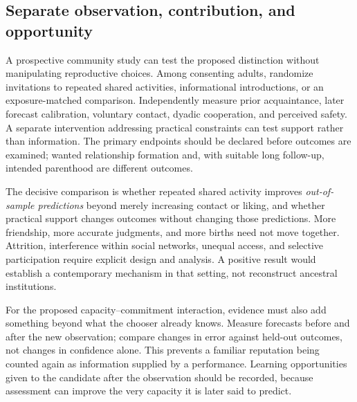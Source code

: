 \documentclass[10pt,twocolumn,letterpaper]{article}
\begin{document}
\subsection{Separate observation, contribution, and opportunity}
A prospective community study can test the proposed distinction without manipulating reproductive choices. Among consenting adults, randomize invitations to repeated shared activities, informational introductions, or an exposure-matched comparison. Independently measure prior acquaintance, later forecast calibration, voluntary contact, dyadic cooperation, and perceived safety. A separate intervention addressing practical constraints can test support rather than information. The primary endpoints should be declared before outcomes are examined; wanted relationship formation and, with suitable long follow-up, intended parenthood are different outcomes.

The decisive comparison is whether repeated shared activity improves \emph{out-of-sample predictions} beyond merely increasing contact or liking, and whether practical support changes outcomes without changing those predictions. More friendship, more accurate judgments, and more births need not move together. Attrition, interference within social networks, unequal access, and selective participation require explicit design and analysis. A positive result would establish a contemporary mechanism in that setting, not reconstruct ancestral institutions.

For the proposed capacity--commitment interaction, evidence must also add something beyond what the chooser already knows. Measure forecasts before and after the new observation; compare changes in error against held-out outcomes, not changes in confidence alone. This prevents a familiar reputation being counted again as information supplied by a performance. Learning opportunities given to the candidate after the observation should be recorded, because assessment can improve the very capacity it is later said to predict.
\end{document}
